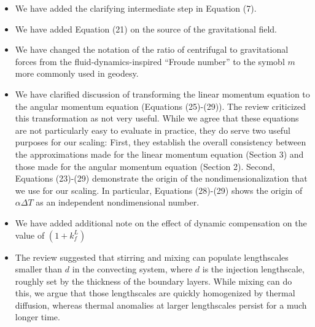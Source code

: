 \documentclass[a4paper,12pt]{article}
\begin{document}
\begin{itemize}
\item We have added the clarifying intermediate step in Equation (7).
\item We have added Equation (21) on the source of the gravitational field.
\item We have changed the notation of the ratio of centrifugal to gravitational forces from
the fluid-dynamics-inspired ``Froude number'' to the symobl $m$ more commonly used in geodesy.
\item We have clarified discussion of transforming the linear momentum equation to the
angular momentum equation (Equations (25)-(29)). The review criticized this transformation as not very useful.
While we agree that these equations are not particularly easy to evaluate in practice,
they do serve two useful purposes for our scaling: First, they establish the overall consistency
between the approximations made for the linear momentum equation (Section 3) and those made for
the angular momentum equation (Section 2). Second, Equations (23)-(29) demonstrate the
origin of the nondimensionalization that we use for our scaling. In particular, Equations (28)-(29)
shows the origin of $\alpha \Delta T$ as an independent nondimensional number.
\item We have added additional note on the effect of dynamic compensation on the value of $(1+k_f^L)$
\item The review suggested that stirring and mixing can populate lengthscales smaller than $d$
in the convecting system, where $d$ is the injection lengthscale, roughly set by the thickness of
the boundary layers. While mixing can do this, we argue that those lengthscales are
quickly homogenized by thermal diffusion, whereas thermal anomalies at larger lengthscales 
persist for a much longer time.

\end{itemize}
\end{document}
